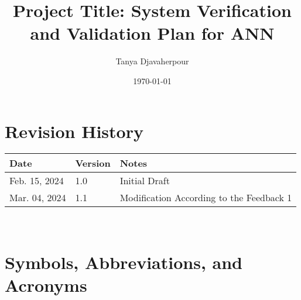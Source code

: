 \documentclass[12pt, titlepage]{article}
\begin{document}
\title{Project Title: System Verification and Validation Plan for ANN} 
\author{Tanya Djavaherpour}
\date{\today}
	
\maketitle


\section*{Revision History}

\begin{tabularx}{\textwidth}{p{3cm}p{2cm}X}
\toprule {\bf Date} & {\bf Version} & {\bf Notes}\\
\midrule
Feb. 15, 2024 & 1.0 & Initial Draft\\
Mar. 04, 2024 & 1.1 & Modification According to the Feedback 1\\
\bottomrule
\end{tabularx}

~\\


\newpage

\tableofcontents

\listoftables


\newpage

\section{Symbols, Abbreviations, and Acronyms}
\end{document}
